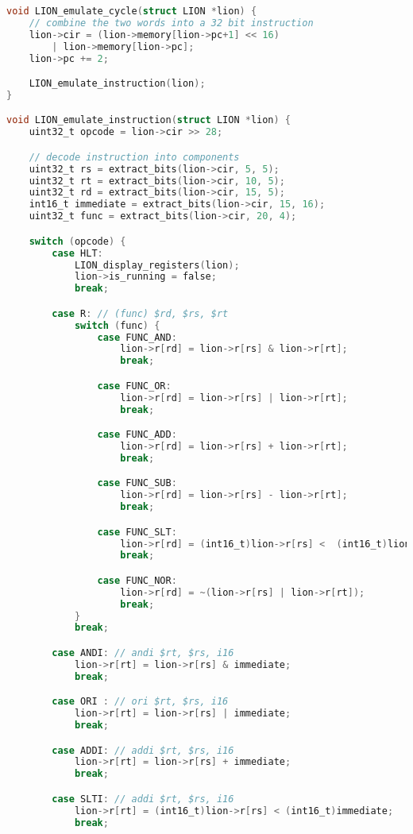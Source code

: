 \begin{lstlisting}[language=C]
void LION_emulate_cycle(struct LION *lion) {
    // combine the two words into a 32 bit instruction
    lion->cir = (lion->memory[lion->pc+1] << 16) 
        | lion->memory[lion->pc];
    lion->pc += 2;        

    LION_emulate_instruction(lion);
}

void LION_emulate_instruction(struct LION *lion) {
    uint32_t opcode = lion->cir >> 28;

    // decode instruction into components 
    uint32_t rs = extract_bits(lion->cir, 5, 5);
    uint32_t rt = extract_bits(lion->cir, 10, 5);
    uint32_t rd = extract_bits(lion->cir, 15, 5);
    int16_t immediate = extract_bits(lion->cir, 15, 16);
    uint32_t func = extract_bits(lion->cir, 20, 4);

    switch (opcode) {
        case HLT:
            LION_display_registers(lion);
            lion->is_running = false;
            break;

        case R: // (func) $rd, $rs, $rt
            switch (func) {
                case FUNC_AND:
                    lion->r[rd] = lion->r[rs] & lion->r[rt];
                    break;

                case FUNC_OR:
                    lion->r[rd] = lion->r[rs] | lion->r[rt];
                    break;

                case FUNC_ADD:
                    lion->r[rd] = lion->r[rs] + lion->r[rt];
                    break;

                case FUNC_SUB:
                    lion->r[rd] = lion->r[rs] - lion->r[rt];
                    break;

                case FUNC_SLT:
                    lion->r[rd] = (int16_t)lion->r[rs] <  (int16_t)lion->r[rt];
                    break;

                case FUNC_NOR:
                    lion->r[rd] = ~(lion->r[rs] | lion->r[rt]);
                    break;
            }
            break;

        case ANDI: // andi $rt, $rs, i16
            lion->r[rt] = lion->r[rs] & immediate;
            break;

        case ORI : // ori $rt, $rs, i16
            lion->r[rt] = lion->r[rs] | immediate;
            break;

        case ADDI: // addi $rt, $rs, i16
            lion->r[rt] = lion->r[rs] + immediate;
            break;

        case SLTI: // addi $rt, $rs, i16
            lion->r[rt] = (int16_t)lion->r[rs] < (int16_t)immediate;
            break;


\end{lstlisting}
